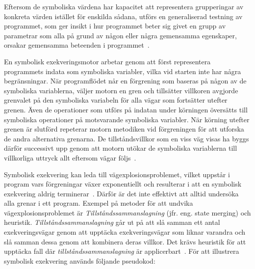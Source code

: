 Eftersom de symboliska värdena har kapacitet att representera grupperingar av konkreta
värden istället för enskilda sådana, utförs en generaliserad testning av programmet,
som ger insikt i hur programmet beter sig givet en grupp av parametrar som alla
på grund av någon eller några gemensamma egenskaper, orsakar gemensamma beteenden
i programmet~\cite{Cadar}.

En symbolisk exekveringsmotor arbetar genom att först representera programmets
indata som symboliska variabler, vilka vid starten inte har några begränsningar.
När programflödet når en förgrening som baseras på någon av de symboliska
variablerna, väljer motorn en gren och tillsätter villkoren avgjorde grenvalet på den
symboliska variabeln för alla vägar som fortsätter utefter grenen. Även de operationer
som utförs på indatan under körningen översätts till symboliska operationer på
motsvarande symboliska variabler. När körning utefter grenen är
slutförd repeterar motorn metodiken vid förgreningen för att utforska de andra
alternativa grenarna. De tillståndsvillkor som en viss väg visas ha byggs därför
successivt upp genom att motorn utökar de symboliska variablerna till
villkorliga uttryck allt eftersom vägar följs~\cite{klee}.

Symbolisk exekvering kan leda till vägexplosionsproblemet, vilket
uppstår i program vars förgreningar växer exponentiellt och resulterar i att en
symbolisk exekvering aldrig terminerar~\cite{path_explo}. Därför är det inte effektivt
att alltid undersöka alla grenar i ett program. Exempel på metoder för att
undvika vägexplosionsproblemet är \emph{Tillståndssammanslagning} (jfr. eng. state merging) och heuristik.
\emph{Tillståndssammanslagning} går ut på att slå samman ett antal
exekveringsvägar genom att upptäcka exekveringsvägar som liknar varandra och
slå samman dessa genom att kombinera deras villkor. Det krävs heuristik för att
upptäcka fall där \emph{tillståndssammanslagning} är applicerbart~\cite{survey_symb_exc}.
För att illustrera symbolisk exekvering används följande pseudokod:

